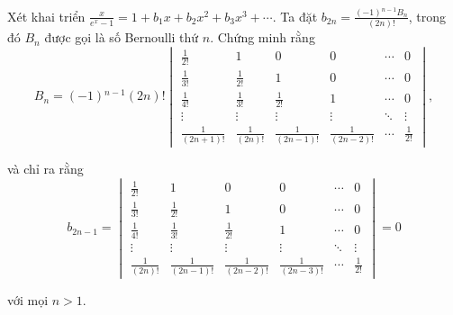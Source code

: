 \documentclass[class=nhvh-linear-algebra,crop=false]{standalone}
\begin{document}
\begin{exercise}
    \par Xét khai triển $\frac{x}{e^{x} - 1} = 1 + b_{1}x + b_{2}x^{2} + b_{3}x^{3} + \cdots$. Ta đặt $b_{2n} = \frac{(-1){}^{n-1}B_{n}}{(2n)!}$, trong đó $B_{n}$ được gọi là số Bernoulli thứ $n$. Chứng minh rằng
    \[
        B_{n} = (-1){}^{n-1}(2n)!
        \begin{vmatrix}
            \frac{1}{2!}      & 1               & 0                 & 0                 & \cdots & 0            \\
            \frac{1}{3!}      & \frac{1}{2!}    & 1                 & 0                 & \cdots & 0            \\
            \frac{1}{4!}      & \frac{1}{3!}    & \frac{1}{2!}      & 1                 & \cdots & 0            \\
            \vdots            & \vdots          & \vdots            & \vdots            & \ddots & \vdots       \\
            \frac{1}{(2n+1)!} & \frac{1}{(2n)!} & \frac{1}{(2n-1)!} & \frac{1}{(2n-2)!} & \cdots & \frac{1}{2!}
        \end{vmatrix},
    \]
    \par và chỉ ra rằng
    \[
        b_{2n-1} =
        \begin{vmatrix}
            \frac{1}{2!}    & 1                 & 0                 & 0                 & \cdots & 0            \\
            \frac{1}{3!}    & \frac{1}{2!}      & 1                 & 0                 & \cdots & 0            \\
            \frac{1}{4!}    & \frac{1}{3!}      & \frac{1}{2!}      & 1                 & \cdots & 0            \\
            \vdots          & \vdots            & \vdots            & \vdots            & \ddots & \vdots       \\
            \frac{1}{(2n)!} & \frac{1}{(2n-1)!} & \frac{1}{(2n-2)!} & \frac{1}{(2n-3)!} & \cdots & \frac{1}{2!}
        \end{vmatrix}
        = 0
    \]
    \par với mọi $n > 1$.
\end{exercise}
\end{document}
